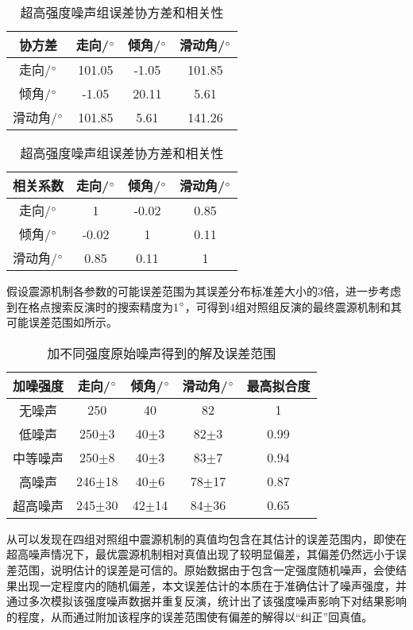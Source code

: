 \begin{table}[ht]
\centering
\caption{超高强度噪声组误差协方差和相关性}
\label{tab3_05}
    \begin{tabular}{c c c c}
    \hline
    协方差 & 走向/$^\circ$ & 倾角/$^\circ$ & 滑动角/$^\circ$ \\
    \hline
	走向/$^\circ$ 		&101.05 	&-1.05		&101.85\\
	倾角/$^\circ$		&-1.05		&20.11		&5.61\\
	滑动角/$^\circ$	&101.85		&5.61		&141.26\\
    \hline
    \end{tabular}
    \begin{tabular}{c c c c}
    \hline
    相关系数 & 走向/$^\circ$ & 倾角/$^\circ$ & 滑动角/$^\circ$ \\
    \hline
	走向/$^\circ$ 		&1 			&-0.02		&0.85\\
	倾角/$^\circ$		&-0.02		&1			&0.11\\
	滑动角/$^\circ$	&0.85		&0.11		&1\\
    \hline
    \end{tabular}
\end{table}
假设震源机制各参数的可能误差范围为其误差分布标准差大小的3倍，进一步考虑到在格点搜索反演时的搜索精度为1$^\circ$，可得到4组对照组反演的最终震源机制和其可能误差范围如所示。
\begin{table}[ht]
\centering
\caption{加不同强度原始噪声得到的解及误差范围}
\label{tab3_06}
    \begin{tabular}{c c c c c}
    \hline
    加噪强度 & 走向/$^\circ$ & 倾角/$^\circ$ & 滑动角/$^\circ$ &最高拟合度 \\
    \hline
    无噪声		& 250 & 40 & 82  & 1\\
    低噪声		& 250$\pm$3 & 40$\pm$3 & 82$\pm$3 & 0.99 \\
    中等噪声	& 250$\pm$8 & 40$\pm$3 & 83$\pm$7 & 0.94 \\
    高噪声		& 246$\pm$18 & 40$\pm$6 & 78$\pm$17 & 0.87 \\
    超高噪声	& 245$\pm$30 & 42$\pm$14 & 84$\pm$36 & 0.65 \\
    \hline
    \end{tabular}
\end{table}

从可以发现在四组对照组中震源机制的真值均包含在其估计的误差范围内，即使在超高噪声情况下，最优震源机制相对真值出现了较明显偏差，其偏差仍然远小于误差范围，说明估计的误差是可信的。原始数据由于包含一定强度随机噪声，会使结果出现一定程度内的随机偏差，本文误差估计的本质在于准确估计了噪声强度，并通过多次模拟该强度噪声数据并重复反演，统计出了该强度噪声影响下对结果影响的程度，从而通过附加该程序的误差范围使有偏差的解得以“纠正”回真值。


